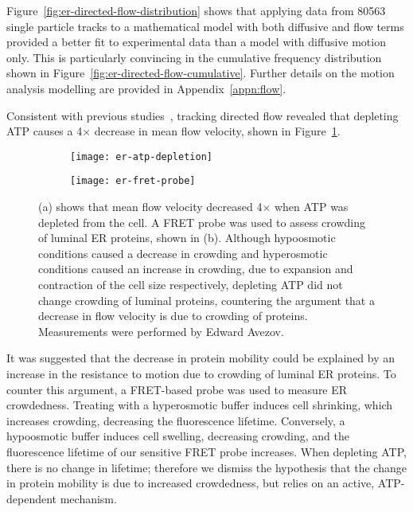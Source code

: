 Figure~\ref{fig:er-directed-flow-distribution} shows that applying data from \num{80563} single particle tracks to a mathematical model with both diffusive and flow terms provided a better fit to experimental data than a model with diffusive motion only.
This is particularly convincing in the cumulative frequency distribution shown in Figure~\ref{fig:er-directed-flow-cumulative}.
Further details on the motion analysis modelling are provided in Appendix~\ref{appn:flow}. 

Consistent with previous studies~\cite{nehls2000dynamics}, tracking directed flow revealed that depleting ATP causes a 4$\times$ decrease in mean flow velocity, shown in Figure~\ref{fig:er-atp-depletion}.

\begin{figure}[h!]
	\centering
	\begin{subfigure}[b]{0.3\textwidth}
		\texttt{[image: er-atp-depletion]}
		\caption{} \label{fig:er-atp-depletion}
	\end{subfigure}
	\hspace{0.15\textwidth}
	\begin{subfigure}[b]{0.3\textwidth}
		\texttt{[image: er-fret-probe]}
		\caption{} \label{fig:er-fret-probe}
	\end{subfigure}
	\caption[ER: Flow velocity is reduced upon ATP depletion; a FRET probe reveals this is not due to increased crowding]{(a) shows that mean flow velocity decreased 4$\times$ when ATP was depleted from the cell. A FRET probe was used to assess crowding of luminal ER proteins, shown in (b). Although hypoosmotic conditions caused a decrease in crowding and hyperosmotic conditions caused an increase in crowding, due to expansion and contraction of the cell size respectively, depleting ATP did not change crowding of luminal proteins, countering the argument that a decrease in flow velocity is due to crowding of proteins. Measurements were performed by Edward Avezov. }
	\label{fig:er-atp}
\end{figure}

It was suggested that the decrease in protein mobility could be explained by an increase in the resistance to motion due to crowding of luminal ER proteins.
To counter this argument, a FRET-based probe was used to measure ER crowdedness.
Treating with a hyperosmotic buffer induces cell shrinking, which increases crowding, decreasing the fluorescence lifetime.
Conversely, a hypoosmotic buffer induces cell swelling, decreasing crowding, and the fluorescence lifetime of our sensitive FRET probe increases.
When depleting ATP, there is no change in lifetime;
therefore we dismiss the hypothesis that the change in protein mobility is due to increased crowdedness, but relies on an active, ATP-dependent mechanism.

